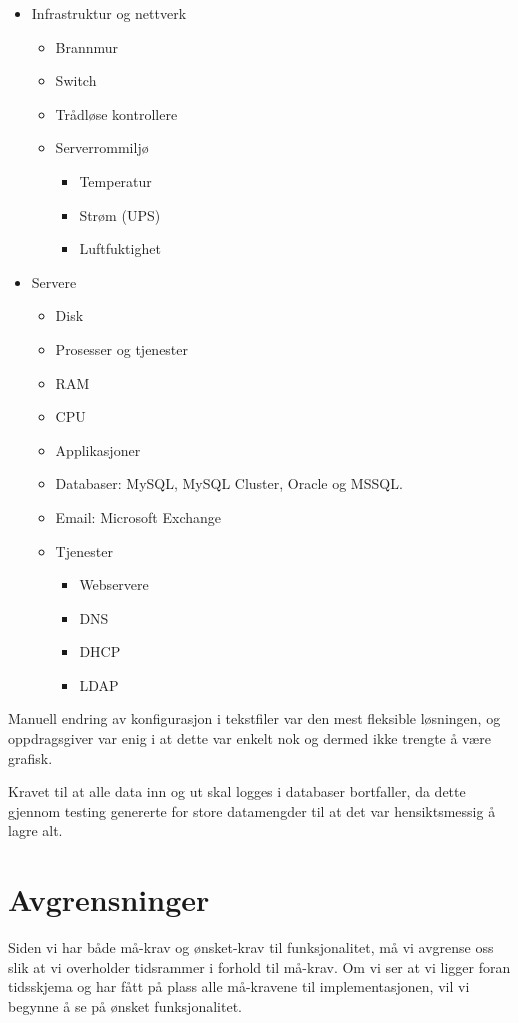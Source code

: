 \begin{itemize}
	\item Infrastruktur og nettverk
	\begin{itemize}
		\item Brannmur
		\item Switch
		\item Trådløse kontrollere
		\item Serverrommiljø
		\begin{itemize}
			\item Temperatur
			\item Strøm (UPS)
			\item Luftfuktighet
		\end{itemize}
	\end{itemize}
	\item Servere
	\begin{itemize}
		\item Disk
		\item Prosesser og tjenester
		\item RAM
		\item CPU
		\item Applikasjoner
		\item Databaser: MySQL, MySQL Cluster, Oracle og MSSQL.
		\item Email: Microsoft Exchange
		\item Tjenester
		\begin{itemize}
			\item Webservere
			\item DNS 
			\item DHCP
			\item LDAP
		\end{itemize}
	\end{itemize}
\end{itemize}

Manuell endring av konfigurasjon i tekstfiler var den mest fleksible løsningen, og oppdragsgiver var enig i at dette var enkelt nok og dermed ikke trengte å være grafisk.

Kravet til at alle data inn og ut skal logges i databaser bortfaller, da dette gjennom testing genererte for store datamengder til at det var hensiktsmessig å lagre alt.


\section{Avgrensninger}
Siden vi har både må-krav og ønsket-krav til funksjonalitet, må vi avgrense oss slik at vi overholder tidsrammer i forhold til må-krav. Om vi ser at vi ligger foran tidsskjema og har fått på plass alle må-kravene til implementasjonen, vil vi begynne å se på ønsket funksjonalitet.

